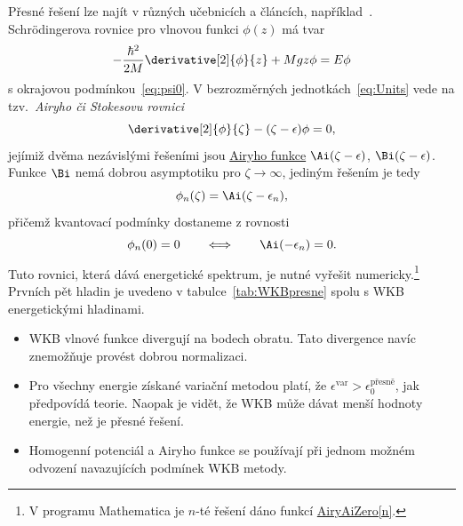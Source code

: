 \begin{solution}
\begin{enumerate}
        Přesné řešení lze najít v různých učebnicích a článcích, například~\cite{GeaBanacloche1999,Skala2011}.
        Schrödingerova rovnice pro vlnovou funkci $\phi(z)$ má tvar
        \begin{equation}
            -\frac{\hbar^{2}}{2M}\derivative[2]{\phi}{z}+Mgz\phi=E\phi
        \end{equation}
        s okrajovou podmínkou~\eqref{eq:psi0}.
        V bezrozměrných jednotkách~\eqref{eq:Units} vede na tzv.~\emph{Airyho či Stokesovu rovnici}
        \begin{equation}
            \derivative[2]{\phi}{\zeta}-(\zeta-\epsilon)\phi=0,
        \end{equation}
        jejímiž dvěma nezávislými řešeními jsou \href{https://en.wikipedia.org/wiki/Airy_function}{Airyho funkce} $\Ai(\zeta-\epsilon)$, $\Bi(\zeta-\epsilon)$.
        Funkce $\Bi$ nemá dobrou asymptotiku pro $\zeta\rightarrow\infty$, jediným řešením je tedy
        \begin{equation}
            \label{eq:PresneResult}
            \phi_{n}(\zeta)=\Ai(\zeta-\epsilon_{n}),
        \end{equation}
        přičemž kvantovací podmínky dostaneme z rovnosti
        \begin{equation}
            \phi_{n}(0)=0\qquad\Longleftrightarrow\qquad\Ai(-\epsilon_{n})=0.
        \end{equation}
        Tuto rovnici, která dává energetické spektrum, je nutné vyřešit numericky.\footnote{
            V programu Mathematica je $n$-té řešení dáno funkcí \href{https://reference.wolfram.com/language/ref/AiryAiZero.html}{AiryAiZero[n]}.
        }
        Prvních pět hladin je uvedeno v tabulce~\ref{tab:WKBpresne} spolu s WKB energetickými hladinami.

    \end{enumerate}

\note
    \begin{itemize}
        \item
            WKB vlnové funkce divergují na bodech obratu.
            Tato divergence navíc znemožňuje provést dobrou normalizaci.

        \item
            Pro všechny energie získané variační metodou platí, že $\epsilon^{\text{var}}>\epsilon_{0}^{\text{přesně}}$, jak předpovídá teorie.
            Naopak je vidět, že WKB může dávat menší hodnoty energie, než je přesné řešení.

        \item
            Homogenní potenciál a Airyho funkce se používají při jednom možném odvození navazujících podmínek WKB metody.


\end{itemize}
\end{solution}
